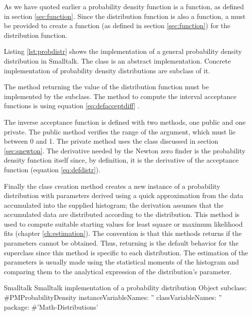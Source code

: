 As we have quoted earlier a probability density function is a function, as defined in section \ref{sec:function}. Since the distribution function is also a function, a 
must be provided to create a function (as defined in section
\ref{sec:function}) for the distribution function.

Listing \ref{lst:probdistr} shows the implementation of a general
probability density distribution in Smalltalk. The class  is an abstract implementation.
Concrete implementation of probability density distributions are subclass
of it.

The method  returning the value of the
distribution function must be implemented by the subclass.
The method to compute the interval acceptance functions is using
equation \ref{eq:defacceptdiff} .

The inverse acceptance function is defined with two methods, one
public and one private. The public method verifies the range of
the argument, which must lie between 0 and 1. The private method
uses the class  discussed in section
\ref{sec:snewton}.
The derivative needed by the Newton zero finder is the probability density function itself since, by definition,
it is the derivative of the acceptance function (\cf equation \ref{eq:defdistr}).

Finally the class creation method  creates a new instance of a probability distribution with parameters derived using a quick approximation from the data accumulated into the
supplied histogram; the derivation assumes that the accumulated data are distributed according to the distribution.
This method is used to compute suitable starting values for least square or
maximum likelihood fits (\cf chapter \ref{ch:estimation}). The
convention is that this methods returns  if the
parameters cannot be obtained.
Thus, returning  is the default behavior for the superclass since this method is specific
to each distribution. The estimation of the parameters is usually
made using the statistical moments of the histogram and comparing
them to the analytical expression of the distribution's parameter.

%
\begin{listing}[label=lst:probdistr]{Smalltalk}
{Smalltalk implementation of a probability distribution}
Object subclass: #PMProbabilityDensity
    instanceVariableNames: ''
    classVariableNames: ''
    package: #'Math-Distributions'
\end{listing}

